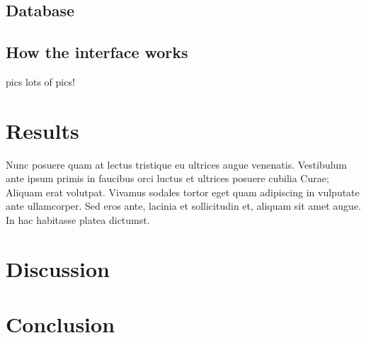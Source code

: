 \subsection{Database}

\subsection{How the interface works}
pics lots of pics!

\section{Results}

Nunc posuere quam at lectus tristique eu ultrices augue venenatis. Vestibulum ante ipsum primis in faucibus orci luctus et ultrices posuere cubilia Curae; Aliquam erat volutpat. Vivamus sodales tortor eget quam adipiscing in vulputate ante ullamcorper. Sed eros ante, lacinia et sollicitudin et, aliquam sit amet augue. In hac habitasse platea dictumst.


\section{Discussion}


\section{Conclusion}

